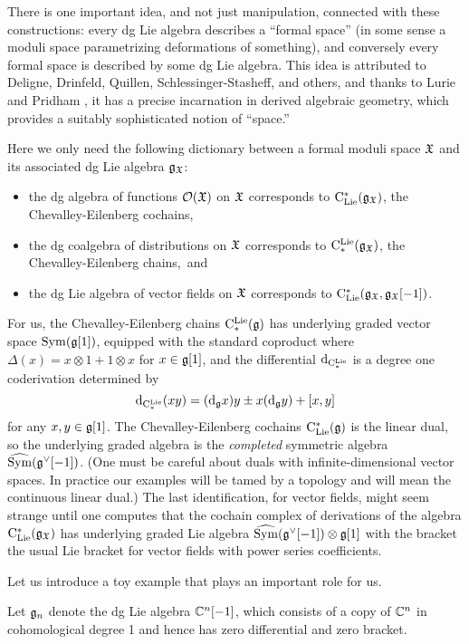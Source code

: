 There is one important idea, and not just manipulation, connected with these constructions:
every dg Lie algebra describes a ``formal space'' (in some sense a moduli space parametrizing deformations of something), 
and conversely every formal space is described by some dg Lie algebra.
This idea is attributed to Deligne, Drinfeld, Quillen, Schlessinger-Stasheff, and others, 
and thanks to Lurie \cite{LurieSAG} and Pridham \cite{Pridham}, 
it has a precise incarnation in derived algebraic geometry, 
which provides a suitably sophisticated notion of ``space.''

Here we only need the following dictionary between a formal moduli space $\frak{X}$ and its associated dg Lie algebra $\mathfrak g_{\frak{X}}$:
\begin{itemize}
\item the dg algebra of functions $\mathcal O(\frak{X})$ on $\frak{X}$ corresponds to ${\rm C}_{\rm Lie}^*(\mathfrak g_{\frak{X}})$, the Chevalley-Eilenberg cochains,
\item the dg coalgebra of distributions on $\frak{X}$ corresponds to ${\rm C}^{{\rm Lie}}_*(\mathfrak g_{\frak{X}})$, the Chevalley-Eilenberg chains,~and
\item the dg Lie algebra of vector fields on $\frak{X}$ corresponds to ${\rm C}_{\rm Lie}^*(\mathfrak g_{\frak{X}},\mathfrak g_{\frak{X}}[-1])$.
\end{itemize}
For us, the Chevalley-Eilenberg chains ${\rm C}^{\rm Lie}_*(\mathfrak g)$ has underlying graded vector space ${\rm Sym}(\mathfrak g[1])$,
equipped with the standard coproduct where $\Delta(x) = x \otimes 1 + 1 \otimes x$ for $x \in \mathfrak g[1]$, 
and the differential ${\rm d}_{{\rm C}^{\rm Lie}_*}$ is a degree one coderivation determined by  
\[
{\rm d}_{{\rm C}^{\rm Lie}_*}(xy) = ({\rm d}_\mathfrak g x) y \pm x({\rm d}_\mathfrak g y) + [x,y]
\]
for any $x,y \in \mathfrak g[1]$.
The Chevalley-Eilenberg cochains ${\rm C}_{\rm Lie}^*(\mathfrak g)$ is the linear dual, so the underlying graded algebra is the {\em completed}
symmetric algebra $\widehat{{\rm Sym}}(\mathfrak g^\vee[-1])$.
(One must be careful about duals with infinite-dimensional vector spaces. 
In practice our examples will be tamed by a topology and will mean the continuous linear dual.)
The last identification, for vector fields, might seem strange until one computes that 
the cochain complex of derivations of the algebra ${\rm C}_{\rm Lie}^*(\mathfrak g_{\frak{X}})$ has underlying graded Lie algebra 
$\widehat{{\rm Sym}}(\mathfrak g^\vee[-1]) \otimes \mathfrak g[1]$ with the bracket the usual Lie bracket for vector fields with power series coefficients.

Let us introduce a toy example that plays an important role for us. 

\begin{dfn}\label{dfn fgn}
Let $\mathfrak{g}_n$ denote the dg Lie algebra $\mathbb C^n[-1]$,
which consists of a copy of $\mathbb C^n$ in cohomological degree 1
and hence has zero differential and zero bracket.
\end{dfn}

